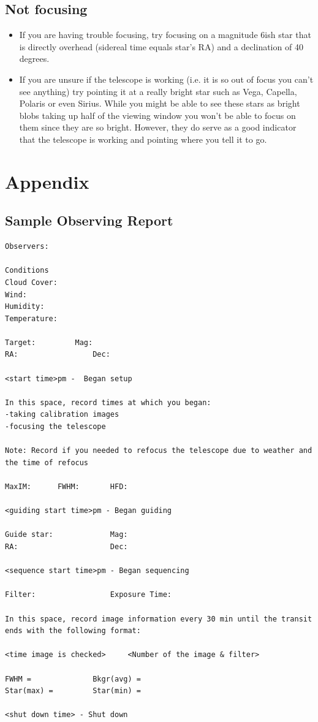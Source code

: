 \documentclass[11pt]{report}
\begin{document}
\section{Not focusing}
\begin{itemize}
\item If you are having trouble focusing, try focusing on a magnitude 6ish star that is directly overhead (sidereal time equals star's RA) and a declination of 40 degrees.
\item If you are unsure if the telescope is working (i.e. it is so out of focus you can't see anything) try pointing it at a really bright star such as Vega, Capella, Polaris or even Sirius. While you might be able to see these stars as bright blobs taking up half of the viewing window you won't be able to focus on them since they are so bright. However, they do serve as a good indicator that the telescope is working and pointing where you tell it to go.
\end{itemize}


\chapter{Appendix}

\section{Sample Observing Report}

\begin{verbatim}
Observers:

Conditions
Cloud Cover:
Wind:
Humidity:
Temperature:

Target:			Mag:
RA: 				Dec:

<start time>pm -  Began setup

In this space, record times at which you began: 
-taking calibration images
-focusing the telescope 

Note: Record if you needed to refocus the telescope due to weather and the time of refocus

MaxIM: 		FWHM: 		HFD:

<guiding start time>pm - Began guiding 

Guide star: 			Mag:
RA: 					Dec:
	
<sequence start time>pm - Began sequencing

Filter: 				Exposure Time:

In this space, record image information every 30 min until the transit ends with the following format:

<time image is checked> 	<Number of the image & filter>

FWHM =				Bkgr(avg) =
Star(max) =			Star(min) =

<shut down time> - Shut down
\end{verbatim}
\end{document}
